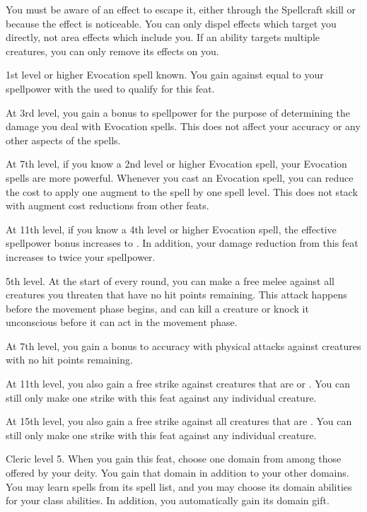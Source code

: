     You must be aware of an effect to escape it, either through the Spellcraft skill or because the effect is noticeable.
    You can only dispel effects which target you directly, not area effects which include you.
    If an ability targets multiple creatures, you can only remove its effects on you.

    \featpre 1st level or higher Evocation spell known.
    \featben You gain  against  equal to your spellpower with the  used to qualify for this feat.

    At 3rd level, you gain a  bonus to spellpower for the purpose of determining the damage you deal with Evocation spells.
    This does not affect your accuracy or any other aspects of the spells.

    At 7th level, if you know a 2nd level or higher Evocation spell, your Evocation spells are more powerful.
    Whenever you cast an Evocation spell, you can reduce the cost to apply one augment to the spell by one spell level.
    This does not stack with augment cost reductions from other feats.

    At 11th level, if you know a 4th level or higher Evocation spell, the effective spellpower bonus increases to .
    In addition, your damage reduction from this feat increases to twice your spellpower.

    \featpres 5th level.
    \featben At the start of every round, you can make a free melee  against all creatures you threaten that have no hit points remaining.
    This attack happens before the movement phase begins, and can kill a creature or knock it unconscious before it can act in the movement phase.

    At 7th level, you gain a  bonus to accuracy with physical attacks against creatures with no hit points remaining.

    At 11th level, you also gain a free strike against creatures that are \helpless or \unaware.
    You can still only make one strike with this feat against any individual creature.

    At 15th level, you also gain a free strike against all creatures that are \bloodied.
    You can still only make one strike with this feat against any individual creature.

    \featpre Cleric level 5.
    \featben When you gain this feat, choose one domain from among those offered by your deity.
    You gain that domain in addition to your other domains.
    You may learn spells from its spell list, and you may choose its domain abilities for your class abilities.
    In addition, you automatically gain its domain gift.

